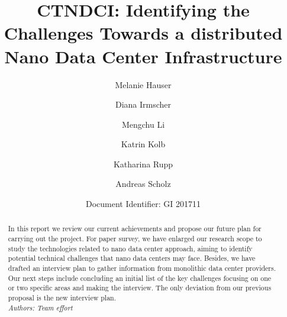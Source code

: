 \documentclass[sigchi-a, authorversion]{acmart}
\begin{document}
\title{CTNDCI: Identifying the Challenges Towards a distributed Nano Data Center Infrastructure}

\author{Melanie Hauser}

\author{Diana Irmscher} 

\author{Mengchu Li}

\author{Katrin Kolb}

\author{Katharina Rupp}

\author{Andreas Scholz}



\author{Document Identifier: GI 201711}
\renewcommand{\shortauthors}{Katrin Kolb et al.}

\begin{abstract}  %
In this report we review our current achievements and propose our future plan for carrying out the project. 
For paper survey, we have enlarged our research scope to study the technologies related to nano data center approach, 
aiming to identify potential technical challenges that nano data centers may face. 
Besides, we have drafted an interview plan to gather information from monolithic data center providers. 
Our next steps include concluding an initial list of the key challenges focusing on one or two specific areas and making the interview. 
The only deviation from our previous proposal is the new interview plan.\\
\textit{Authors: Team effort}\\
\end{abstract}

\end{document}
